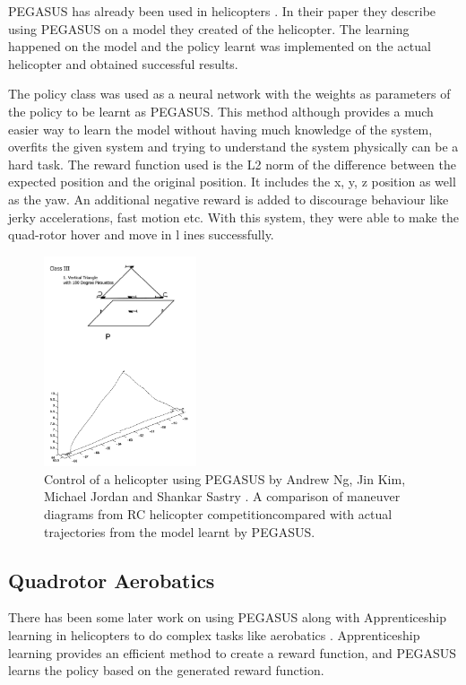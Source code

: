 \documentclass[hidelinks,BTech]{iitmdiss}
\begin{document}
PEGASUS has already been used in helicopters \cite{HelicopterPegasus}. In their paper they describe using PEGASUS on a model they created of the helicopter. The learning happened on the model and the policy learnt was implemented on the actual helicopter and obtained successful results.

The policy class was used as a neural network with the weights as parameters of the policy to be learnt as PEGASUS. This method although provides a much easier way to learn the model without having much knowledge of the system, overfits the given system and trying to understand the system physically can be a hard task.
The reward function used is the L2 norm of the difference between the expected position and the original position. It includes the x, y, z position as well as the yaw. An additional negative reward is added to discourage behaviour like jerky accelerations, fast motion etc. With this system, they were able to make the quad-rotor hover and move in l	ines successfully.

\begin{figure}[H]
  \centering
    \includegraphics[width=0.4\textwidth]{pegasus_helicopter.png}
    \caption{Control of a helicopter using PEGASUS by Andrew Ng, Jin Kim, Michael Jordan and Shankar Sastry \cite{HelicopterPegasus}. A comparison of maneuver diagrams from RC helicopter competition\protect\footnotemark \space compared with actual trajectories from the model learnt by PEGASUS.}
\end{figure}

\subsection*{Quadrotor Aerobatics}
There has been some later work on using PEGASUS along with Apprenticeship learning in helicopters to do complex tasks like aerobatics \cite{ApprenticeshipHelicopterAerobatics}. Apprenticeship learning provides an efficient method to create a reward function, and PEGASUS learns the policy based on the generated reward function.
\end{document}
